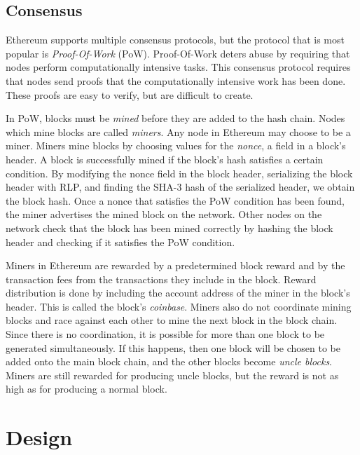 \documentclass[12pt]{article}
\newcounter{protocol}
\begin{document}
\subsection{Consensus} \label{subsection:consensus}
Ethereum supports multiple consensus protocols, but the protocol that is most popular is \emph{Proof-Of-Work} (PoW). Proof-Of-Work deters abuse by requiring that nodes perform computationally intensive tasks. This consensus protocol requires that nodes send proofs that the computationally intensive work has been done. These proofs are easy to verify, but are difficult to create.

In PoW, blocks must be \emph{mined} before they are added to the hash chain. Nodes which mine blocks are called \emph{miners}. Any node in Ethereum may choose to be a miner.
Miners mine blocks by choosing values for the \emph{nonce}, a field in a block's header. A block is successfully mined if the block's hash satisfies a certain condition. By modifying the nonce field in the block header, serializing the block header with RLP, and finding the SHA-3 hash of the serialized header, we obtain the block hash. Once a nonce that satisfies the PoW condition has been found, the miner advertises the mined block on the network. Other nodes on the network check that the block has been mined correctly by hashing the block header and checking if it satisfies the PoW condition.

Miners in Ethereum are rewarded by a predetermined block reward and by the transaction fees from the transactions they include in the block. Reward distribution is done by including the account address of the miner in the block's header. This is called the block's \emph{coinbase}. Miners also do not coordinate mining blocks and race against each other to mine the next block in the block chain. Since there is no coordination, it is possible for more than one block to be generated simultaneously. If this happens, then one block will be chosen to be added onto the main block chain, and the other blocks become \emph{uncle blocks}. Miners are still rewarded for producing uncle blocks, but the reward is not as high as for producing a normal block.


\section{Design}
\end{document}
